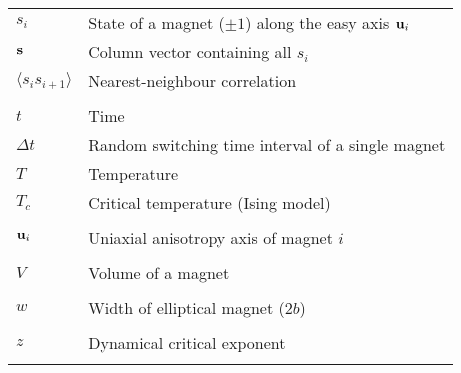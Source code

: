\begin{longtable}[l]{p{60pt} p{350pt}}
	$s_i$ & State of a magnet ($\pm 1$) along the easy axis $\boldsymbol{\mathbf{u}}_i$ \\
	$\boldsymbol{\mathbf{s}}$ & Column vector containing all $s_i$ \\
	$\langle s_i s_{i+1} \rangle$ & Nearest-neighbour correlation \\
	&\\

	$t$ & Time \\
	$\Delta t$ & Random switching time interval of a single magnet \\
	$T$ & Temperature \\
	$T_c$ & Critical temperature (Ising model) \\
	&\\

	$\boldsymbol{\mathbf{u}}_i$ & Uniaxial anisotropy axis of magnet $i$ \\
	&\\

	$V$ & Volume of a magnet \\
	&\\

	$w$ & Width of elliptical magnet ($2b$) \\
	&\\
	
	$z$ & Dynamical critical exponent \\
	&\\
\end{longtable}

